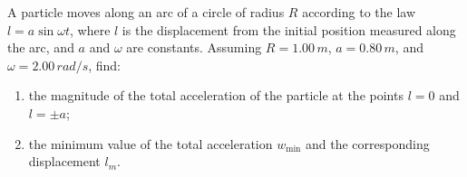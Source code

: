 
\item A particle moves along an arc of a circle of radius \( R \) according to the law \( l = a \sin \omega t \), where \( l \) is the displacement from the initial position measured along the arc, and \( a \) and \( \omega \) are constants. Assuming \( R = 1.00 \, m \), \( a = 0.80 \, m \), and \( \omega = 2.00 \, rad/s \), find:
    \begin{enumerate}
        \item the magnitude of the total acceleration of the particle at the points \( l = 0 \) and \( l = \pm a \);
        \item the minimum value of the total acceleration \( w_{\text{min}} \) and the corresponding displacement \( l_m \).
    \end{enumerate}
